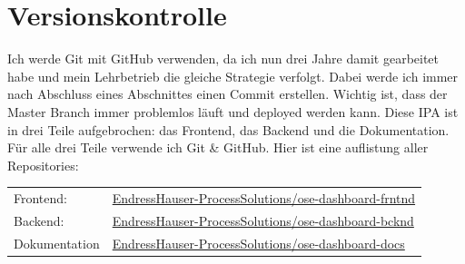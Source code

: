 \section{Versionskontrolle}
Ich werde Git mit GitHub verwenden, da ich nun drei Jahre damit gearbeitet habe und mein Lehrbetrieb die gleiche Strategie verfolgt. Dabei werde ich immer nach Abschluss eines Abschnittes einen Commit erstellen. Wichtig ist, dass der Master Branch immer problemlos läuft und deployed werden kann.
\newline
\newline
Diese IPA ist in drei Teile aufgebrochen: das Frontend, das Backend und die Dokumentation. Für alle drei Teile verwende ich Git \& GitHub. Hier ist eine auflistung aller Repositories:
\begin{table}[htp]
  \begin{tabularx}{\textwidth}{l X}
  Frontend: & \href{https://github.com/EndressHauser-ProcessSolutions/ose-dashboard-frntnd}{EndressHauser-ProcessSolutions/ose-dashboard-frntnd} \\
  Backend: & \href{https://github.com/EndressHauser-ProcessSolutions/ose-dashboard-bcknd}{EndressHauser-ProcessSolutions/ose-dashboard-bcknd} \\
  Dokumentation & \href{https://github.com/EndressHauser-ProcessSolutions/ose-dashboard-docs}{EndressHauser-ProcessSolutions/ose-dashboard-docs} \\
  \end{tabularx}
\end{table}
